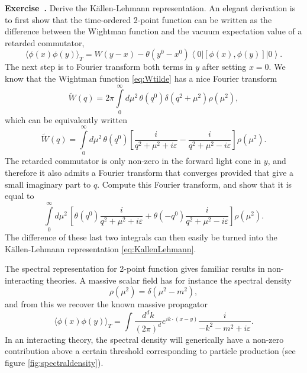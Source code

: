 \documentclass[a4paper,12pt]{article}
\newcommand{\ket}[1]{\left| #1 \right\rangle}
\newcommand{\bra}[1]{\left\langle #1 \right|}
\numberwithin{equation}{section}
\newcounter{exercise}[section]
\newenvironment{exercise}[1][]%
	{\refstepcounter{exercise}\bigskip
	\begin{mdframed}[backgroundcolor=gray!20, linewidth=0]
	\noindent\textbf{Exercise~\thesection.\theexercise #1} \rmfamily}
  	{\end{mdframed}\bigskip}
\begin{document}
\begin{exercise}
	Derive the Källen-Lehmann representation.
	An elegant derivation is to first show that the 
	time-ordered 2-point function can be written as the difference
	between the Wightman function and the vacuum expectation value
	of a retarded commutator,
	$$
	\langle \phi(x) \phi(y) \rangle_T
	= 
	W(y - x)
	- \theta(y^0 - x^0)
	\bra{0} \left[ \phi(x), \phi(y) \right] \ket{0}.
	$$
	The next step is to Fourier transform both terms in $y$
	after setting $x = 0$.
	We know that the Wightman function \eqref{eq:Wtilde}
	has a nice Fourier transform
	$$
		\widetilde{W}(q)
		= 2\pi \int\limits_0^\infty d\mu^2 \,
		\theta(q^0) 
		\delta(q^2 + \mu^2) \rho(\mu^2),
	$$
	which can be equivalently written
	$$
		\widetilde{W}(q)
		= \int\limits_0^\infty d\mu^2 \,
		\theta(q^0) 
		\left[ \frac{i}{q^2 + \mu^2 + i \varepsilon}
		- \frac{i}{q^2 + \mu^2 - i \varepsilon} \right] \rho(\mu^2).
	$$
	The retarded commutator is only non-zero in the forward light cone
	in $y$, and therefore it also admits a Fourier transform
	that converges provided that give a small imaginary part to $q$.
	Compute this Fourier transform, and show that it is equal to
	$$
		\int\limits_0^\infty d\mu^2 \,
		\left[ \theta(q^0) \frac{i}{q^2 + \mu^2 + i \varepsilon}
		+ \theta(-q^0) \frac{i}{q^2 + \mu^2 - i \varepsilon}
		\right] \rho(\mu^2).
	$$
	The difference of these last two integrals can then easily be
	turned into the Källen-Lehmann representation
	\eqref{eq:KallenLehmann}.
\end{exercise}
%
The spectral representation for 2-point function gives familiar results in non-interacting theories. A massive scalar field has for instance the spectral density
\begin{equation}
	\rho(\mu^2) = \delta(\mu^2 - m^2),
\end{equation}
and from this we recover the known massive propagator
\begin{equation}
	\langle \phi(x) \phi(y) \rangle_T
	= \int \frac{d^dk}{(2\pi)^d}
	e^{i k \cdot (x - y)}
	\frac{i}
	{-k^2 - m^2 + i \varepsilon}.
\end{equation}
In an interacting theory, the spectral density will generically have a non-zero contribution above a certain threshold corresponding to particle production (see figure \ref{fig:spectraldensity}).
\end{document}
